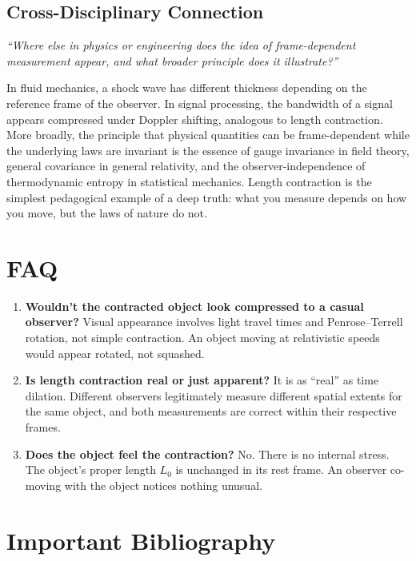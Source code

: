 \subsection*{Cross-Disciplinary Connection}
\textit{``Where else in physics or engineering does the idea of frame-dependent measurement appear, and what broader principle does it illustrate?''}

In fluid mechanics, a shock wave has different thickness depending on the reference frame of the observer. In signal processing, the bandwidth of a signal appears compressed under Doppler shifting, analogous to length contraction. More broadly, the principle that physical quantities can be frame-dependent while the underlying laws are invariant is the essence of gauge invariance in field theory, general covariance in general relativity, and the observer-independence of thermodynamic entropy in statistical mechanics. Length contraction is the simplest pedagogical example of a deep truth: what you measure depends on how you move, but the laws of nature do not.

\section*{FAQ}

\begin{enumerate}
\item \textbf{Wouldn't the contracted object look compressed to a casual observer?}
Visual appearance involves light travel times and Penrose--Terrell rotation, not simple contraction. An object moving at relativistic speeds would appear rotated, not squashed.

\item \textbf{Is length contraction real or just apparent?}
It is as ``real'' as time dilation. Different observers legitimately measure different spatial extents for the same object, and both measurements are correct within their respective frames.

\item \textbf{Does the object feel the contraction?}
No. There is no internal stress. The object's proper length $L_{0}$ is unchanged in its rest frame. An observer co-moving with the object notices nothing unusual.
\end{enumerate}
\section*{Important Bibliography}

